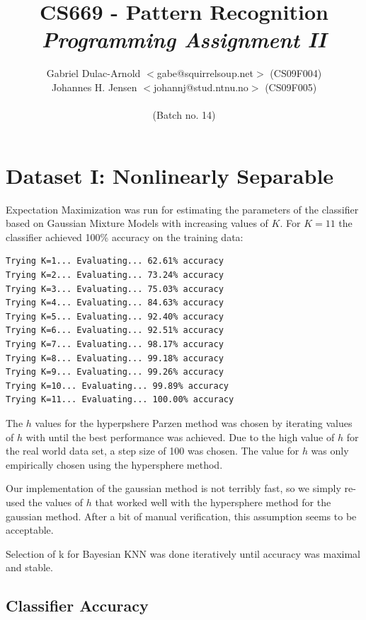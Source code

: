 \documentclass[a4paper]{article}
\author{Gabriel Dulac-Arnold $<$gabe@squirrelsoup.net$>$ (CS09F004) \\
Johannes H. Jensen $<$johannj@stud.ntnu.no$>$ (CS09F005) \\
\\
(Batch no. 14)}
\title{CS669 - Pattern Recognition\\
\emph{Programming Assignment II}}
\begin{document}
\setlength{\parskip}{2ex}
\setlength{\tabcolsep}{8pt}
\renewcommand\arraystretch{1.5}
\maketitle

\section{Dataset I: Nonlinearly Separable}

Expectation Maximization was run for estimating the parameters of the
classifier based on Gaussian Mixture Models with increasing values of $K$.
For $K=11$ the classifier achieved 100\% accuracy on the training data:

\begin{verbatim}
Trying K=1... Evaluating... 62.61% accuracy
Trying K=2... Evaluating... 73.24% accuracy
Trying K=3... Evaluating... 75.03% accuracy
Trying K=4... Evaluating... 84.63% accuracy
Trying K=5... Evaluating... 92.40% accuracy
Trying K=6... Evaluating... 92.51% accuracy
Trying K=7... Evaluating... 98.17% accuracy
Trying K=8... Evaluating... 99.18% accuracy
Trying K=9... Evaluating... 99.26% accuracy
Trying K=10... Evaluating... 99.89% accuracy
Trying K=11... Evaluating... 100.00% accuracy
\end{verbatim}

The $h$ values for the hyperpshere Parzen method was chosen by iterating 
values of $h$ with until the best performance was achieved.  Due to the 
high value of $h$ for the real world data set, a step size of 100 was chosen. 
The value for $h$ was only empirically chosen using the hypersphere method. 

Our implementation of the gaussian method is not terribly fast, so we simply
re-used the values of $h$ that worked well with the hypersphere method for 
the gaussian method. After a bit of manual verification, this assumption 
seems to be acceptable.

Selection of k for Bayesian KNN was done iteratively until accuracy was 
maximal and stable.

\subsection{Classifier Accuracy}
\end{document}
